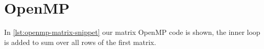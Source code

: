 \documentclass[final]{report}
\begin{document}
\chapter{OpenMP}


In \cref{lst:openmp-matrix-snippet} our matrix OpenMP code is shown, the inner loop is added to sum over all rows of the first matrix.
\end{document}
